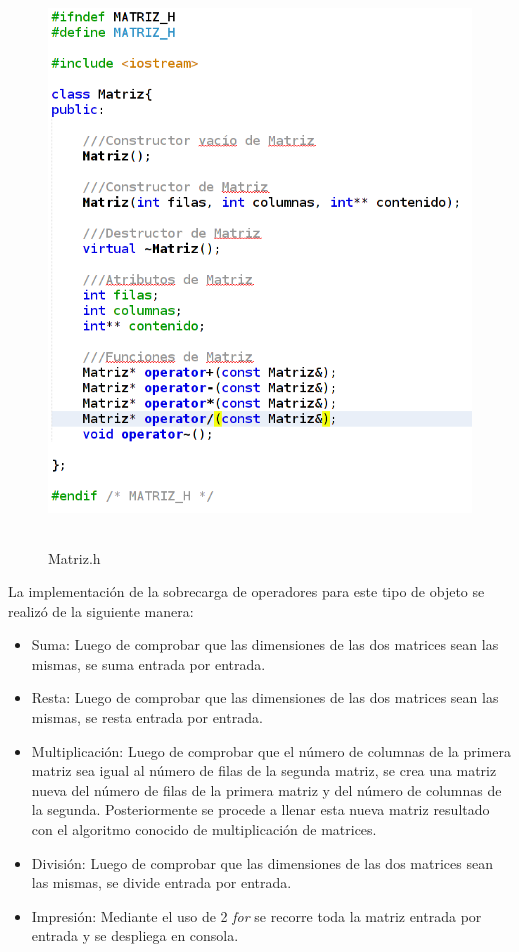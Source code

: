 \documentclass[11pt]{article}
\begin{document}
\begin{figure}[H]
\centering
\includegraphics[height=15cm, width=\textwidth]{img/HeaderMatriz.png}
\caption{Matriz.h}
\label{fig:math}
\end{figure}


La implementación de la sobrecarga de operadores para este tipo de objeto se realizó de la siguiente manera:
\begin{itemize}
\item Suma: Luego de comprobar que las dimensiones de las dos matrices sean las mismas, se suma entrada por entrada.
\item Resta: Luego de comprobar que las dimensiones de las dos matrices sean las mismas, se resta entrada por entrada.
\item Multiplicación: Luego de comprobar que el número de columnas de la primera matriz sea igual al número de filas de la segunda matriz, se crea una matriz nueva del número de filas de la primera matriz y del número de columnas de la segunda. Posteriormente se procede a llenar esta nueva matriz resultado con el algoritmo conocido de multiplicación de matrices.
\item División: Luego de comprobar que las dimensiones de las dos matrices sean las mismas, se divide entrada por entrada.
\item Impresión: Mediante el uso de 2 \textit{for} se recorre toda la matriz entrada por entrada y se despliega en consola. 
\end{itemize}
\newpage 
\end{document}
